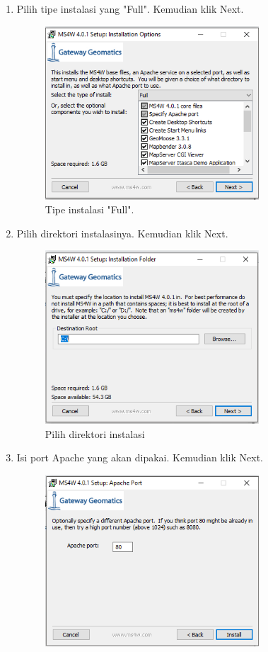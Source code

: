 \begin{enumerate}
	\item  Pilih tipe instalasi yang "Full". Kemudian klik Next.
	\hfill\break
	\begin{figure}[H]
		\includegraphics[width=8cm]{figures/Tugas4/1174074/4.png}
		\centering
		\caption{Tipe instalasi "Full".}
	\end{figure}
	\item  Pilih direktori instalasinya. Kemudian klik Next.
	\hfill\break
	\begin{figure}[H]
		\includegraphics[width=8cm]{figures/Tugas4/1174074/5.png}
		\centering
		\caption{Pilih direktori instalasi}
	\end{figure}
	\item  Isi port Apache yang akan dipakai. Kemudian klik Next.
	\hfill\break
	\begin{figure}[H]
		\includegraphics[width=8cm]{figures/Tugas4/1174074/6.png}

\end{figure}
\end{enumerate}
